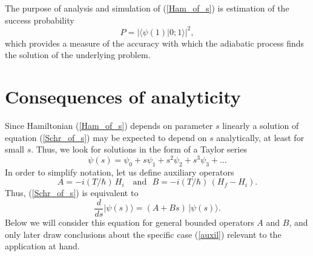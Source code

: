 \documentclass[11 pt]{article}
\begin{document}
The purpose of analysis and simulation of (\ref{Ham_of_s}) is estimation of the success probability
\begin{equation}\label{success}
P = |\langle \psi(1)| 0;1\rangle |^2,
\end{equation}
which provides a measure of the accuracy with which the adiabatic process finds the solution of the underlying problem. 

\section{Consequences of analyticity}

Since Hamiltonian (\ref{Ham_of_s}) depends on parameter $s$ linearly a solution of equation (\ref{Schr_of_s}) may be expected to depend on $s$ analytically, at least for small $s$. Thus, we look for solutions in the form of a Taylor series
\begin{equation}\label{Ansatz}
\psi(s) = \psi_0 +s\psi_1 +s^2\psi_2 + s^3\psi_3+\ldots
\end{equation}
In order to simplify notation, let us define auxiliary operators
\begin{equation}\label{auxil}
A = -i(T/\hbar)\, H_i \quad \mbox{and }\,\, B=-i(T/\hbar)\,(H_f-H_i). 
\end{equation}
Thus, (\ref{Schr_of_s}) is equivalent to
\begin{equation}\label{Schr_AB}
\frac{d}{ds} |\psi(s)\rangle= (A+Bs)\,|\psi(s)\rangle.
\end{equation}
Below we will consider this equation for general bounded operators $A$ and $B$, and only later draw conclusions about the specific case (\ref{auxil}) relevant to the application at hand.
\end{document}
